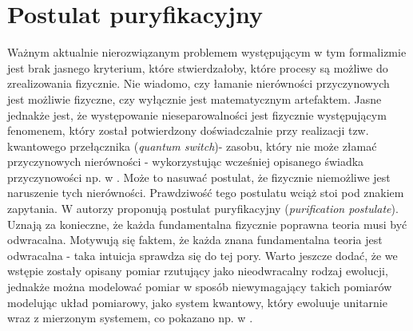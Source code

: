 \documentclass[10pt]{article} %
\begin{document}
\section{Postulat puryfikacyjny}
Ważnym aktualnie nierozwiązanym problemem występującym w tym formalizmie jest brak jasnego kryterium, które stwierdzałoby, które procesy są możliwe do zrealizowania fizycznie.
Nie wiadomo, czy łamanie nierówności przyczynowych jest możliwie fizyczne, czy wyłącznie jest matematycznym artefaktem. Jasne jednakże jest, że występowanie nieseparowalności jest fizycznie występującym fenomenem, który został potwierdzony doświadczalnie przy realizacji tzw. 
kwantowego przełącznika (\textit{quantum switch})- zasobu, który nie może złamać przyczynowych nierówności - wykorzystując wcześniej opisanego świadka przyczynowości np. w \cite{experiment}. Może to nasuwać postulat, że fizycznie niemożliwe jest naruszenie tych nierówności. Prawdziwość tego postulatu wciąż stoi pod znakiem zapytania. W \cite{purification} autorzy proponują postulat puryfikacyjny (\textit{purification postulate}). Uznają za konieczne, że każda fundamentalna fizycznie poprawna teoria
musi być odwracalna. Motywują się faktem, że każda znana fundamentalna teoria jest odwracalna - taka intuicja sprawdza się do tej pory.
Warto jeszcze dodać, że we wstępie zostały opisany pomiar rzutujący jako nieodwracalny rodzaj ewolucji, jednakże można modelować pomiar w sposób niewymagający takich pomiarów modelując układ pomiarowy, jako system kwantowy, który ewoluuje unitarnie wraz z mierzonym systemem, co pokazano np. w
\cite{reversible}. 
\end{document}
